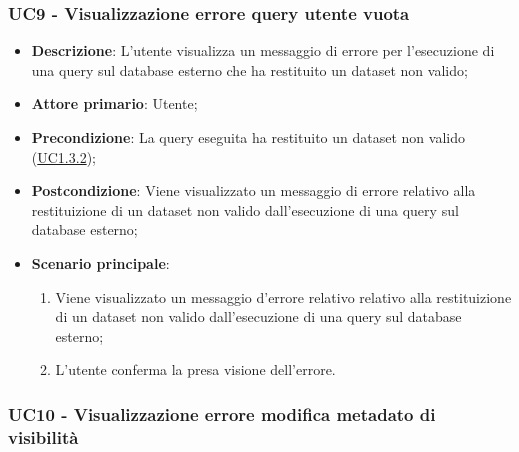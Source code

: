 \subsubsection{UC9 - Visualizzazione errore query utente vuota}
\label{sub:uc9}
\begin{itemize}
    \item \textbf{Descrizione}: L'utente visualizza un messaggio di errore per l'esecuzione di una query sul database 
    esterno che ha restituito un dataset non valido;

    \item \textbf{Attore primario}: Utente;
    
    \item \textbf{Precondizione}:   La query eseguita ha restituito un dataset non valido 
    (\hyperref[par:uc1.3.2]{UC1.3.2});

    \item \textbf{Postcondizione}:   Viene visualizzato un messaggio di errore relativo alla restituizione di un dataset non valido dall'esecuzione di una query sul database esterno;
    
    \item \textbf{Scenario principale}:
    \begin{enumerate}
        \item Viene visualizzato un messaggio d'errore relativo relativo alla restituizione di un dataset non valido 
        dall'esecuzione di una query sul database esterno;
        \item L'utente conferma la presa visione dell'errore.
    \end{enumerate}

\end{itemize}

\subsubsection{UC10 - Visualizzazione errore modifica metadato di visibilità}
\label{sub:uc10}

